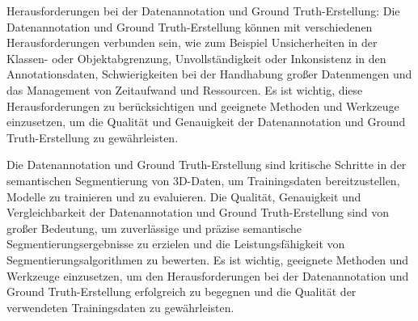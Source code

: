 Herausforderungen bei der Datenannotation und Ground Truth-Erstellung: Die
Datenannotation und Ground Truth-Erstellung können mit verschiedenen
Herausforderungen verbunden sein, wie zum Beispiel Unsicherheiten in der
Klassen- oder Objektabgrenzung, Unvollständigkeit oder Inkonsistenz in den
Annotationsdaten, Schwierigkeiten bei der Handhabung großer Datenmengen und das
Management von Zeitaufwand und Ressourcen. Es ist wichtig, diese
Herausforderungen zu berücksichtigen und geeignete Methoden und Werkzeuge
einzusetzen, um die Qualität und Genauigkeit der Datenannotation und Ground
Truth-Erstellung zu gewährleisten.

Die Datenannotation und Ground Truth-Erstellung sind kritische Schritte in der
semantischen Segmentierung von 3D-Daten, um Trainingsdaten bereitzustellen,
Modelle zu trainieren und zu evaluieren. Die Qualität, Genauigkeit und
Vergleichbarkeit der Datenannotation und Ground Truth-Erstellung sind von
großer Bedeutung, um zuverlässige und präzise semantische
Segmentierungsergebnisse zu erzielen und die Leistungsfähigkeit von
Segmentierungsalgorithmen zu bewerten. Es ist wichtig, geeignete Methoden und
Werkzeuge einzusetzen, um den Herausforderungen bei der Datenannotation und
Ground Truth-Erstellung erfolgreich zu begegnen und die Qualität der
verwendeten Trainingsdaten zu gewährleisten.